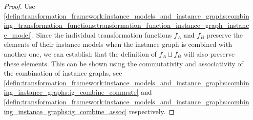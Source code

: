 \begin{proof}
Use \cref{defin:transformation_framework:instance_models_and_instance_graphs:combining_transformation_functions:transformation_function_instance_graph_instance_model}. Since the individual transformation functions $f_A$ and $f_B$ preserve the elements of their instance models when the instance graph is combined with another one, we can establish that the definition of $f_{A} \sqcup f_{B}$ will also preserve these elements. This can be shown using the commutativity and associativity of the combination of instance graphs, see \cref{defin:transformation_framework:instance_models_and_instance_graphs:combining_instance_graphs:ig_combine_commute} and \cref{defin:transformation_framework:instance_models_and_instance_graphs:combining_instance_graphs:ig_combine_assoc} respectively.
\end{proof}